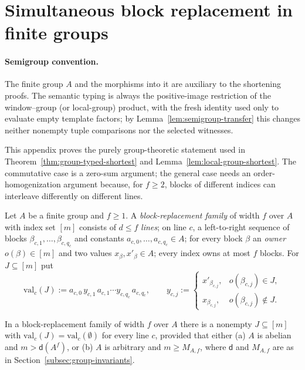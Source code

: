 \section{Simultaneous block replacement in finite groups}
\label{app:group-blocks}

\paragraph{Semigroup convention.}
The finite group $A$ and the morphisms into it are auxiliary to the shortening
proofs.  The semantic typing is always the positive-image restriction of the
window--group (or local-group) product, with the fresh identity used only to
evaluate empty template factors; by Lemma~\ref{lem:semigroup-transfer} this
changes neither nonempty tuple comparisons nor the selected witnesses.

This appendix proves the purely group-theoretic statement used in
Theorem~\ref{thm:group-typed-shortest} and Lemma~\ref{lem:local-group-shortest}.
The commutative case is a zero-sum argument; the general case needs an
order-homogenization argument because, for $f\ge2$, blocks of different
indices can interleave differently on different lines.

\begin{definition}
\label{def:block-family}
Let $A$ be a finite group and $f\ge1$.  A \emph{block-replacement family} of
width $f$ over $A$ with index set $[m]$ consists of $d\le f$ \emph{lines}; on
line $c$, a left-to-right sequence of blocks $\beta_{c,1},\ldots,\beta_{c,q_c}$
and constants $a_{c,0},\ldots,a_{c,q_c}\in A$; for every block $\beta$ an
\emph{owner} $o(\beta)\in[m]$ and two values $x_\beta,x'_\beta\in A$; every
index owns at most $f$ blocks.  For $J\subseteq[m]$ put
\[
 \mathrm{val}_c(J):=a_{c,0}\,y_{c,1}\,a_{c,1}\cdots y_{c,q_c}\,a_{c,q_c},
 \qquad
 y_{c,j}:=
 \begin{cases}
 x'_{\beta_{c,j}},& o(\beta_{c,j})\in J,\\
 x_{\beta_{c,j}},& o(\beta_{c,j})\notin J.
 \end{cases}
\]
\end{definition}

\begin{lemma}
\label{lem:block-replacement}
In a block-replacement family of width $f$ over $A$ there is a nonempty
$J\subseteq[m]$ with $\mathrm{val}_c(J)=\mathrm{val}_c(\emptyset)$ for every
line $c$, provided that either
\textup{(a)} $A$ is abelian and $m>\mathsf d(A^f)$, or
\textup{(b)} $A$ is arbitrary and $m\ge M_{A,f}$, where $\mathsf d$ and
$M_{A,f}$ are as in Section~\ref{subsec:group-invariants}.
\end{lemma}

